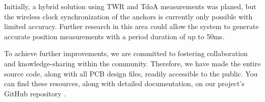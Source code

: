 \documentclass[conference, a4paper]{IEEEtran}
\begin{document}
Initially, a hybrid solution using \ac{TWR} and \ac{TdoA} measurements was planed,
but the wireless clock synchronization of the anchors is currently only possible with limited accuracy.
Further research in this area could allow the system to generate accurate position measurements with a period duration of up to 50ms.

To achieve further improvements, we are committed to fostering collaboration and knowledge-sharing
within the community.
Therefore, we have made the entire source code, along with all PCB design files,
readily accessible to the public.
You can find these resources, along with detailed documentation,
on our project's GitHub repository \cite{uwb-tracking}.



 
\end{document}
